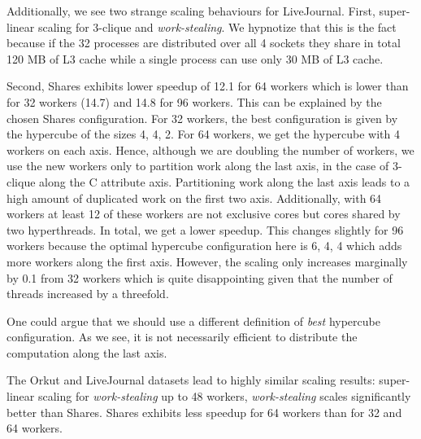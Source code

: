 Additionally, we see two strange scaling behaviours for LiveJournal.
First, super-linear scaling for 3-clique and \textit{work-stealing}.
We hypnotize that this is the fact because if the 32 processes are distributed over all 4 sockets they share in total
120 MB of L3 cache while a single process can use only 30 MB of L3 cache.

Second, Shares exhibits lower speedup of 12.1 for 64 workers which is
lower than for 32 workers (14.7) and 14.8 for 96 workers.
This can be explained by the chosen Shares configuration.
For 32 workers, the best configuration is given by the hypercube of the sizes 4, 4, 2.
For 64 workers, we get the hypercube with 4 workers on each axis.
Hence, although we are doubling the number of workers, we use the new workers only to partition
work along the last axis, in the case of 3-clique along the C attribute axis.
Partitioning work along the last axis leads to a high amount of duplicated work on the first
two axis.
Additionally, with 64 workers at least 12 of these workers are not exclusive cores but cores shared by
two hyperthreads.
In total, we get a lower speedup.
This changes slightly for 96 workers because the optimal hypercube configuration here is 6, 4, 4 which
adds more workers along the first axis.
However, the scaling only increases marginally by 0.1 from 32 workers which is quite disappointing given
that the number of threads increased by a threefold.

One could argue that we should use a different definition of \textit{best} hypercube configuration.
As we see, it is not necessarily efficient to distribute the computation along the last axis.

The Orkut and LiveJournal datasets lead to highly similar scaling results:
super-linear scaling for \textit{work-stealing} up to 48 workers,
\textit{work-stealing} scales significantly better than Shares.
Shares exhibits less speedup for 64 workers than for 32 and 64 workers.









